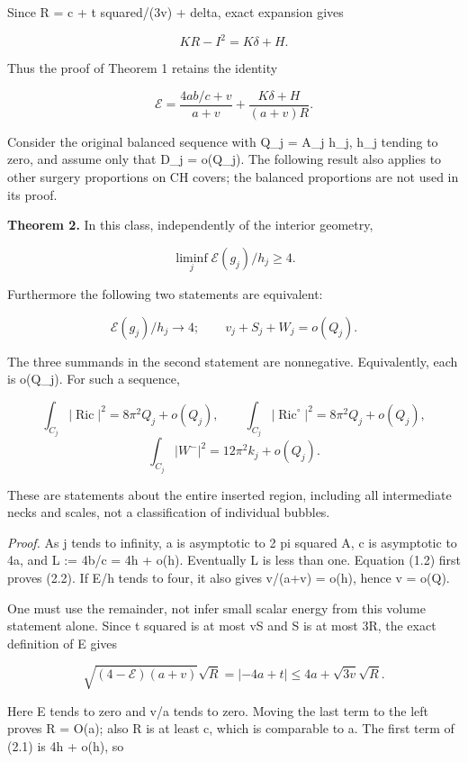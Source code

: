 \documentclass[
  10pt,
]{article}
\begin{document}
Since R = c + t squared/(3v) + delta, exact expansion gives

\[
 KR-I^2=K\delta+H.
\]

Thus the proof of Theorem 1 retains the identity

\[
 \boxed{\mathcal E=
 \frac{4ab/c+v}{a+v}
       +\frac{K\delta+H}{(a+v)R}.}                       \tag{2.1}
\]

Consider the original balanced sequence with Q\_j = A\_j h\_j, h\_j
tending to zero, and assume only that D\_j = o(Q\_j). The following
result also applies to other surgery proportions on CH covers; the
balanced proportions are not used in its proof.

\textbf{Theorem 2.} In this class, independently of the interior
geometry,

\[
 \liminf_j\mathcal E(g_j)/h_j\ge4.                       \tag{2.2}
\]

Furthermore the following two statements are equivalent:

\[
 \mathcal E(g_j)/h_j\longrightarrow4;
 \qquad v_j+S_j+W_j=o(Q_j).                              \tag{2.3}
\]

The three summands in the second statement are nonnegative.
Equivalently, each is o(Q\_j). For such a sequence,

\[
 \int_{C_j}|\operatorname{Ric}|^2=8\pi^2Q_j+o(Q_j),
 \qquad \int_{C_j}|\operatorname{Ric}^{\circ}|^2
                                  =8\pi^2Q_j+o(Q_j),    \tag{2.4}
\] \[
 \int_{C_j}|W^-|^2=12\pi^2k_j+o(Q_j).                   \tag{2.5}
\]

These are statements about the entire inserted region, including all
intermediate necks and scales, not a classification of individual
bubbles.

\emph{Proof.} As j tends to infinity, a is asymptotic to 2 pi squared A,
c is asymptotic to 4a, and L := 4b/c = 4h + o(h). Eventually L is less
than one. Equation (1.2) first proves (2.2). If E/h tends to four, it
also gives v/(a+v) = o(h), hence v = o(Q).

One must use the remainder, not infer small scalar energy from this
volume statement alone. Since t squared is at most vS and S is at most
3R, the exact definition of E gives

\[
 \sqrt{(4-\mathcal E)(a+v)}\sqrt R
       =|-4a+t|\le4a+\sqrt{3v}\sqrt R.
\]

Here E tends to zero and v/a tends to zero. Moving the last term to the
left proves R = O(a); also R is at least c, which is comparable to a.
The first term of (2.1) is 4h + o(h), so
\end{document}
